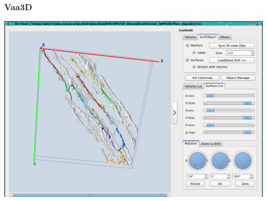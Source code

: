 \documentclass{beamer}
\begin{document}
\begin{frame}\frametitle{Vaa3D}
	\centering
	\includegraphics[height=0.5\textheight]{gfx/present/vaa3d-load-swc}
\end{frame}

\end{document}
